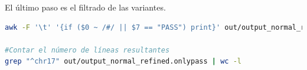 El último paso es el filtrado de las variantes. 
\begin{lstlisting}[language=bash]
awk -F '\t' '{if ($0 ~ /#/ || $7 == "PASS") print}' out/output_normal_refined.recalibrated > out/output_normal_refined.onlypass

#Contar el número de líneas resultantes
grep "^chr17" out/output_normal_refined.onlypass | wc -l
\end{lstlisting}